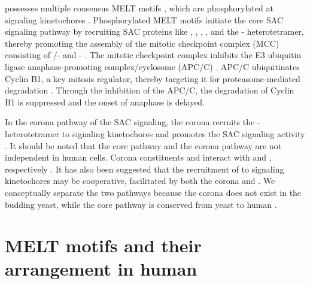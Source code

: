  possesses multiple consensus MELT motifs \cite{MELTEvolution}, which are phosphorylated at signaling kinetochores \cite{MPS1-KNL1_London2012, MPS1-KNL1_Shepperd2012, MPS1-KNL1_Yamagishi2012, MPS1Localization_Ji, MPS1Localization_Hiruma}. Phosphorylated MELT motifs initiate the core SAC signaling pathway by recruiting SAC proteins like , , , , and the - heterotetramer, thereby promoting the assembly of the mitotic checkpoint complex (MCC) consisting of /- and - \cite{RecombinantKNL1, MELTActivity, BubBiochem, BubR1TwoPools, BUB1CD1-MAD1CStructure, Faesen2017, BUB1-CDC20-MAD1, Tripartite, SpMCC}. The mitotic checkpoint complex inhibits the E3 ubiquitin ligase anaphase-promoting complex/cyclosome (APC/C) \cite{APC-MCC_Alfieri2016, APC-MCC_Yamaguchi2016}. APC/C ubiquitinates Cyclin B1, a key mitosis regulator, thereby targeting it for proteasome-mediated degradation \cite{CyclinB1Degradation_Clute+Pines1999, CyclinB1Degradation_Chang2003, SeparaseStructure}. Through the inhibition of the APC/C, the degradation of Cyclin B1 is suppressed and the onset of anaphase is delayed.

In the corona pathway of the SAC signaling, the corona recruits the - heterotetramer to signaling kinetochores and promotes the SAC signaling activity \cite{CoronaActivatesSAC}. It should be noted that the core pathway and the corona pathway are not independent in human cells. Corona constituents  and  interact with  and , respectively \cite{CENPELocalization-BUBR1, CENP-FLimitsStripping}. It has also been suggested that the recruitment of  to signaling kinetochores may be cooperative, facilitated by both the corona and  \cite{MIS12-CEP57-MAD1-MAD2, siROD_Zhang2019}. We conceptually separate the two pathways because the corona does not exist in the budding yeast, while the core pathway is conserved from yeast to human \cite{YeastNoRZZ}.

\section{MELT motifs and their arrangement in human }


